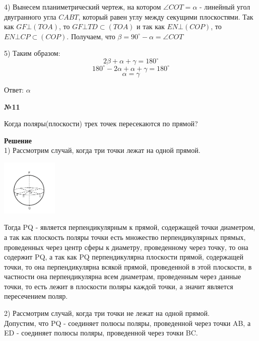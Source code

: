     4) Вынесем планиметрический чертеж, на котором $\angle COT = \alpha$ - линейный угол двугранного угла $CABT$,
    который равен углу между секущими плоскостями.
    Так как $GF \bot (TOA)$, то $GF \bot TD \subset (TOA)$ и так как $EN \bot (COP)$, то $EN \bot CP \subset (COP)$.
    Получаем, что $\beta = 90^\circ - \alpha = \angle COT$

    5) Таким образом:
    \[
        2\beta + \alpha + \gamma = 180^{\circ}
    \]
    \[
        180^{\circ} - 2\alpha + \alpha + \gamma = 180 ^{\circ}
    \]
    \[ \alpha = \gamma \]

    Ответ: $\alpha$
    \begin{center}
        \textbf{№11}
    \end{center}

    Когда поляры(плоскости) трех точек пересекаются по прямой?

    \textbf{Решение}\\

    1) Рассмотрим случай, когда три точки лежат на одной прямой.

    \begin{center}
        \includegraphics[width=0.2\textwidth]{images/Frame 70}\\
    \end{center}

    Тогда PQ - является перпендикулярным к прямой, содержащей точки диаметром,
    а так как плоскость поляры точки есть множество перпендикулярных прямых,
    проведенных через центр сферы к диаметру, проведенному через точку, то она содержит PQ, а так как PQ
    перпендикулярна плоскости прямой, содержащей точки, то она перпендикулярна
    всякой прямой, проведенной в этой плоскости, в частности она перпендикулярна всем диаметрам,
    проведенным через данные точки, то есть лежит в плоскости поляры каждой точки, а
    значит является пересечением поляр.

    2) Рассмотрим случай, когда три точки не лежат на одной прямой.\\

    Допустим, что PQ - соединяет полюсы поляры, проведенной через точки AB, а
    ED - соединяет полюсы поляры, проведенной через точки BC.\\

